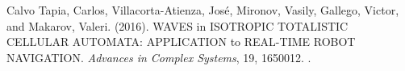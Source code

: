 \documentclass[presentation.tex]{subfiles}
\begin{document}
Calvo Tapia, Carlos, Villacorta-Atienza, José, Mironov, Vasily, Gallego, Victor, and Makarov, Valeri. (2016). WAVES in ISOTROPIC TOTALISTIC CELLULAR AUTOMATA: APPLICATION to REAL-TIME ROBOT NAVIGATION. \textit{Advances in Complex Systems}, 19, 1650012. .
\end{document}
